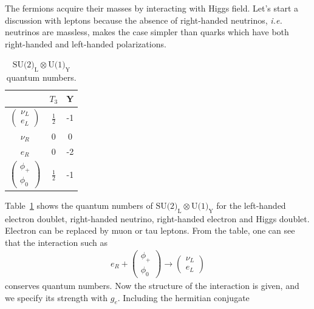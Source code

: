 The fermions acquire their masses by interacting with Higgs field. 
Let's start a discussion with leptons because the absence of right-handed neutrinos, 
\textit{i.e.} neutrinos are massless, makes the case simpler than quarks which 
have both right-handed and left-handed polarizations. 
\begin{table}[htb] 
\centering
\vspace{0.5cm} 
\caption{$\textrm{SU(2)}_\textrm{L} \otimes \textrm{U(1)}_\textrm{Y}$ quantum numbers.}
\vspace{0.5cm} 
\label{tab:su2Qnum}
\begin{tabular}{c c c}
\hline 
      & $T_3$ & Y \\
\hline \hline 
$\left(  \begin{array}{c} \nu_L \\ e_L \end{array} \right)$      & $\displaystyle  \frac{1}{2} $ & -1 \\
$ \nu_{R}$                                                      & 0 & 0 \\
$ e_R$                                                           & 0 & -2 \\
$\left(  \begin{array}{c} \phi_+  \\ \phi_0 \end{array} \right)$      & $\displaystyle  \frac{1}{2} $ & -1 \\
\hline 
\end{tabular}
\end{table}
Table~\ref{tab:su2Qnum} shows the quantum numbers of  
$\textrm{SU(2)}_\textrm{L} \otimes \textrm{U(1)}_\textrm{Y}$
for the left-handed electron doublet, right-handed neutrino, right-handed electron and 
Higgs doublet. Electron can be replaced by muon or tau leptons. 
From the table, one can see that the interaction such as 
\begin{eqnarray} 
e_R + \left(  \begin{array}{c} \phi_+  \\ \phi_0 \end{array} \right) 
\rightarrow 
\left(  \begin{array}{c} \nu_L \\ e_L \end{array} \right)
\end{eqnarray} 
conserves quantum numbers. Now the structure of the interaction is given, and
we specify its strength with $g_e$. Including the hermitian conjugate 
